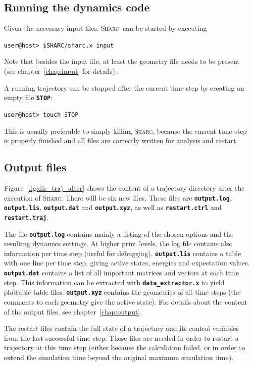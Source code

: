 \documentclass[a4paper,10pt,DIV=15,openany]{scrbook}
\newcommand{\sharc}{\textsc{Sharc}}
\newcommand{\ttt}[1]{\textbf{\texttt{#1}}}
\newenvironment{example}{
  \setlength{\OuterFrameSep}{3pt}
  \vspace{0mm}
  \definecolor{shadecolor}{HTML}{E4F4FF}
  \begin{shaded}
}{
  \end{shaded}
}
\begin{document}
\subsection{Running the dynamics code}

Given the necessary input files, \sharc\ can be started by executing
\begin{example}
\verb|user@host> $SHARC/sharc.x input|
\end{example}
Note that besides the input file, at least the geometry file needs to be present (see chapter~\ref{chap:input} for details).

A running trajectory can be stopped after the current time step by creating an empty file \ttt{STOP}:
\begin{example}
\verb|user@host> touch STOP|
\end{example}
This is usually preferable to simply killing \sharc, because the current time step is properly finished and all files are correctly written for analysis and restart.

\subsection{Output files}

Figure~\ref{fig:dir_traj_after} shows the content of a trajectory directory after the execution of \sharc. There will be six new files. These files are \ttt{output.log}, \ttt{output.lis}, \ttt{output.dat} and \ttt{output.xyz}, as well as \ttt{restart.ctrl} and \ttt{restart.traj}.

The file \ttt{output.log} contains mainly a listing of the chosen options and the resulting dynamics settings. At higher print levels, the log file contains also information per time step (useful for debugging). \ttt{output.lis} contains a table with one line per time step, giving active states, energies and expectation values. \ttt{output.dat} contains a list of all important matrices and vectors at each time step. This information can be extracted with \ttt{data\_extractor.x} to yield plottable table files. \ttt{output.xyz} contains the geometries of all time steps (the comments to each geometry give the active state).
For details about the content of the output files, see chapter~\ref{chap:output}.

The restart files contain the full state of a trajectory and its control variables from the last successful time step. These files are needed in order to restart a trajectory at this time step (either because the calculation failed, or in order to extend the simulation time beyond the original maximum simulation time). 
\end{document}
